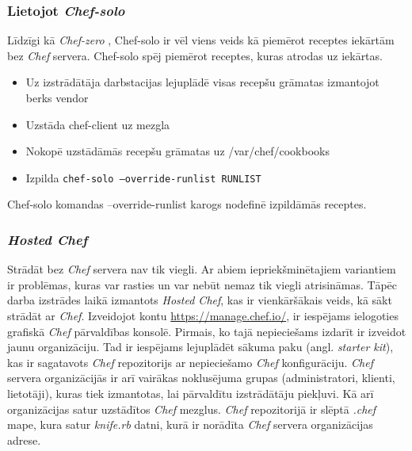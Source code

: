 \subsubsection{Lietojot \textit{Chef-solo}}
Līdzīgi kā \textit{Chef-zero} , Chef-solo ir vēl viens veids kā piemērot receptes iekārtām bez \textit{Chef} servera. Chef-solo spēj piemērot receptes, kuras atrodas uz iekārtas.
\begin{itemize}
	\item Uz izstrādātāja darbstacijas lejuplādē visas recepšu grāmatas izmantojot berks vendor
	\item Uzstāda chef-client uz mezgla
	\item Nokopē uzstādāmās recepšu grāmatas uz /var/chef/cookbooks
	\item Izpilda \texttt{chef-solo --override-runlist RUNLIST}
\end{itemize}
Chef-solo komandas --override-runlist karogs nodefinē izpildāmās receptes.

\subsubsection{\textit{Hosted Chef}}
Strādāt bez \textit{Chef} servera nav tik viegli. Ar abiem iepriekšminētajiem variantiem ir problēmas, kuras var rasties un var nebūt nemaz tik viegli atrisināmas.
Tāpēc darba izstrādes laikā izmantots \textit{Hosted Chef}, kas ir vienkāršākais veids, kā sākt strādāt ar \textit{Chef}.
Izveidojot kontu \url{https://manage.chef.io/}, ir iespējams ielogoties grafiskā \textit{Chef} pārvaldības konsolē.
Pirmais, ko tajā nepieciešams izdarīt ir izveidot jaunu organizāciju. Tad ir iespējams lejuplādēt sākuma paku (angl. \textit{starter kit}), kas ir sagatavots \textit{Chef} repozitorijs ar nepieciešamo \textit{Chef} konfigurāciju. \textit{Chef} servera organizācijās ir arī vairākas noklusējuma grupas (administratori, klienti, lietotāji), kuras tiek izmantotas, lai pārvaldītu izstrādātāju piekļuvi. Kā arī organizācijas satur uzstādītos \textit{Chef} mezglus. \textit{Chef} repozitorijā ir slēptā \textit{.chef} mape, kura satur \textit{knife.rb} datni, kurā ir norādīta \textit{Chef} servera organizācijas adrese.

